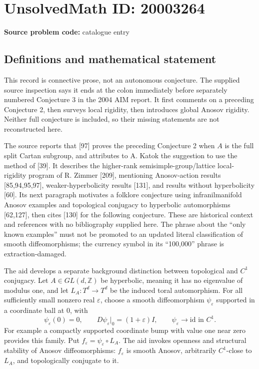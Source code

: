 \documentclass[11pt]{article}
\newcommand{\Z}{\mathbb{Z}}
\newcommand{\eps}{\varepsilon}
\begin{document}
\section*{UnsolvedMath ID: 20003264}
\textbf{Source problem code:} catalogue entry
\subsection{Definitions and mathematical statement}
This record is connective prose, not an autonomous conjecture. The supplied source inspection says it ends at the colon immediately before separately numbered Conjecture 3 in the 2004 AIM report. It first comments on a preceding Conjecture 2, then surveys local rigidity, then introduces global Anosov rigidity. Neither full conjecture is included, so their missing statements are not reconstructed here.

The source reports that [97] proves the preceding Conjecture 2 when $A$ is the full split Cartan subgroup, and attributes to A. Katok the suggestion to use the method of [39]. It describes the higher-rank semisimple-group/lattice local-rigidity program of R. Zimmer [209], mentioning Anosov-action results [85,94,95,97], weaker-hyperbolicity results [131], and results without hyperbolicity [60]. Its next paragraph motivates a folklore conjecture using infranilmanifold Anosov examples and topological conjugacy to hyperbolic automorphisms [62,127], then cites [130] for the following conjecture. These are historical context and references with no bibliography supplied here. The phrase about the ``only known examples'' must not be promoted to an updated literal classification of smooth diffeomorphisms; the currency symbol in its ``100,000'' phrase is extraction-damaged.

The aid develops a separate background distinction between topological and $C^1$ conjugacy. Let $A\in GL(d,\Z)$ be hyperbolic, meaning it has no eigenvalue of modulus one, and let $L_A:T^d\to T^d$ be the induced toral automorphism. For all sufficiently small nonzero real $\eps$, choose a smooth diffeomorphism $\psi_\eps$ supported in a coordinate ball at $0$, with
\[
 \psi_\eps(0)=0,\qquad D\psi_\eps|_0=(1+\eps)I,
 \qquad\psi_\eps\longrightarrow\mathrm{id}\text{ in }C^1.
\]
For example a compactly supported coordinate bump with value one near zero provides this family. Put $f_\eps=\psi_\eps\circ L_A$. The aid invokes openness and structural stability of Anosov diffeomorphisms: $f_\eps$ is smooth Anosov, arbitrarily $C^1$-close to $L_A$, and topologically conjugate to it.
\end{document}
